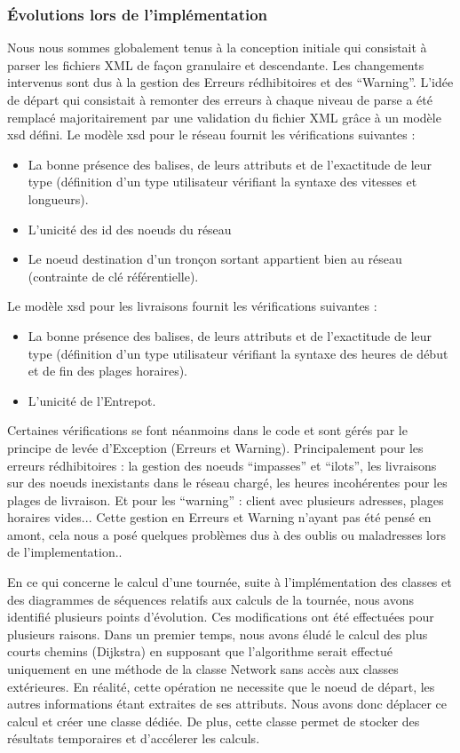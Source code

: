 \subsubsection{Évolutions lors de l'implémentation}

Nous nous sommes globalement tenus à la conception initiale qui consistait à parser les fichiers XML de façon granulaire et descendante. Les changements intervenus sont dus à la gestion des Erreurs rédhibitoires et des “Warning”. 
L’idée de départ qui consistait à remonter des erreurs à chaque niveau de parse a été remplacé majoritairement par une validation du fichier XML grâce à un modèle xsd défini.
Le modèle xsd pour le réseau fournit les vérifications suivantes :
\begin{itemize} 
\item La bonne présence des balises, de leurs attributs et de l’exactitude de leur type (définition d’un type utilisateur vérifiant la syntaxe des vitesses et longueurs).
\item L’unicité des id des noeuds du réseau
\item Le noeud destination d’un tronçon sortant appartient bien au réseau (contrainte de clé référentielle).
\end{itemize}
Le modèle xsd pour les livraisons fournit les vérifications suivantes : 
\begin{itemize}
\item La bonne présence des balises, de leurs attributs et de l’exactitude de leur type (définition d’un type utilisateur vérifiant la syntaxe des heures de début et de fin des plages horaires).
\item L’unicité de l’Entrepot.
\end{itemize}
Certaines vérifications se font néanmoins dans le code et sont gérés par le principe de levée d’Exception (Erreurs et Warning). Principalement pour les erreurs rédhibitoires : la gestion des noeuds “impasses” et “ilots”, les livraisons sur des noeuds inexistants dans le réseau chargé, les heures incohérentes pour les plages de livraison. Et pour les “warning” : client avec plusieurs adresses, plages horaires vides...
Cette gestion en Erreurs et Warning n’ayant pas été pensé en amont, cela nous a posé quelques problèmes dus à des oublis ou maladresses lors de l'implementation..

En ce qui concerne le calcul d'une tournée, suite à l’implémentation des classes et des diagrammes de séquences relatifs aux calculs de la tournée, nous avons identifié plusieurs points d’évolution. Ces modifications ont été effectuées pour plusieurs raisons.
Dans un premier temps, nous avons éludé le calcul des plus courts chemins (Dijkstra) en supposant que l’algorithme serait effectué uniquement en une méthode de la classe Network sans accès aux classes extérieures. En réalité, cette opération ne necessite que le noeud de départ, les autres informations étant extraites de ses attributs. Nous avons donc déplacer ce calcul et créer une classe dédiée. De plus, cette classe permet de stocker des résultats temporaires et d’accélerer les calculs.


